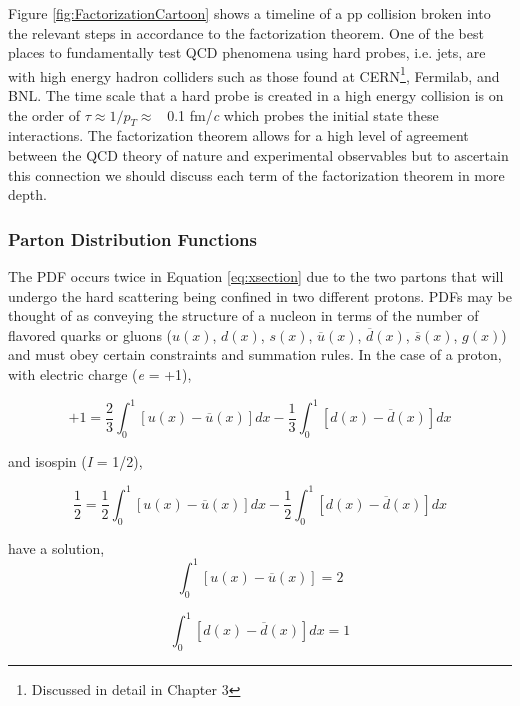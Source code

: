 \noindent
Figure \ref{fig:FactorizationCartoon} shows a timeline of a pp collision broken into the relevant steps in accordance to the factorization theorem.  One of the best places to fundamentally test QCD phenomena using hard probes, i.e. jets, are with high energy hadron colliders such as those found at CERN\footnote{Discussed in detail in Chapter 3}, Fermilab, and BNL. The time scale that a hard probe is created in a high energy collision is on the order of $\tau \approx 1/p_{T} \approx$ \, 0.1 fm/\textit{c} which probes the initial state these interactions.  The factorization theorem allows for a high level of agreement between the QCD theory of nature and experimental observables but to ascertain this connection we should discuss each term of the factorization theorem in more depth.

\subsubsection{Parton Distribution Functions}
The PDF occurs twice in Equation \ref{eq:xsection} due to the two partons that will undergo the hard scattering being confined in two different protons.  PDFs may be thought of as conveying the structure of a nucleon in terms of the number of flavored quarks or gluons ($u(x)$, $d(x)$, $s(x)$, $\overline{u}(x)$, $\overline{d}(x)$, $\overline{s}(x)$, $g(x)$) and must obey certain constraints and summation rules.  In the case of a proton, with electric charge (\textit{e} = +1),

\begin{equation}
+1 = \frac{2}{3} \int_{0}^{1} [u(x) - \overline{u}(x)] dx - \frac{1}{3} \int^{1}_{0} [d(x) - \overline{d}(x)] dx
\label{eq:PDFcharge}
\end{equation}

\noindent
and isospin (\textit{I} = 1/2),

\begin{equation}
\frac{1}{2} = \frac{1}{2} \int_{0}^{1} [u(x) - \overline{u}(x)] dx - \frac{1}{2} \int^{1}_{0} [d(x) - \overline{d}(x)] dx
\label{eq:PDFIso}
\end{equation}

\noindent
have a solution,
\begin{equation}
 \int_{0}^{1} [u(x) - \overline{u}(x)] = 2
\label{eq:PDFSouU}
\end{equation}

\begin{equation}
\int^{1}_{0} [d(x) - \overline{d}(x)] dx = 1
\label{eq:PDFSouD}
\end{equation}

